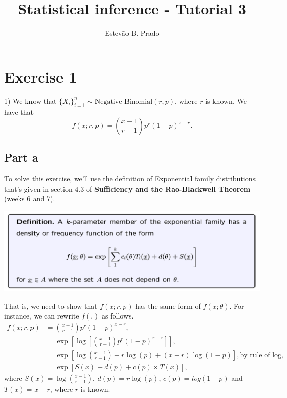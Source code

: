 \documentclass[12pt]{article}
\begin{document}
\title{Statistical inference - Tutorial 3}%
\author{Estev\~ao B. Prado} %
\maketitle

\section{Exercise 1}
1) We know that $\{X_{i}\}_{i=1}^{n} \sim \mbox{Negative Binomial}(r, p)$, where $r$ is known. We have that
\begin{equation}
f(x; r, p) = {x-1 \choose r - 1}p^{r} (1-p)^{x-r}.
\end{equation}

\subsection{Part a}
To solve this exercise, we'll use the definition of Exponential family distributions that's given in section 4.3 of \textbf{Sufficiency and the Rao-Blackwell Theorem} (weeks 6 and 7).

\includegraphics[width=1\linewidth]{Definition_exponential_family.png}

That is, we need to show that $f(x; r, p)$ has the same form of $f(x; \theta)$. For instance, we can rewrite $f(.)$ as follows.
\begin{align}
f(x; r, p) & = {x-1 \choose r - 1}p^{r} (1-p)^{x-r}, \\
& = \exp\left[ \log\left[ {x-1 \choose r - 1}p^{r} (1-p)^{x-r}\right] \right], \\
& = \exp\left[ \log {x-1 \choose r - 1} + r \log\left(p\right) + (x-r) \log\left( 1-p \right) \right], \mbox{by rule of log}, \\
& = \exp\left[ S(x) + d(p) + c(p)\times T(x) \right],
\end{align}
where $S(x) = \log {x-1 \choose r - 1}$, $d(p) = r \log(p)$, $c(p) = log(1-p)$ and $T(x) = x - r$, where $r$ is known.
\end{document}
